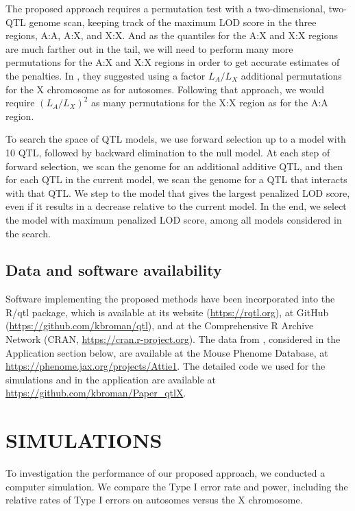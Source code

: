 \documentclass[12pt,letterpaper]{article}
\begin{document}
The proposed approach requires a permutation test with a
two-dimensional, two-QTL genome scan, keeping track of the maximum LOD
score in the three regions, A:A, A:X, and X:X. And as the quantiles
for the A:X and X:X regions are much farther out in the tail, we will
need to perform many more permutations for the A:X and X:X regions in
order to get accurate estimates of the penalties. In
\citet{Broman2006}, they suggested using a factor $L_A/L_X$ additional
permutations for the X chromosome as for autosomes. Following that
approach, we would require $(L_A/L_X)^2$ as many permutations for the
X:X region as for the A:A region.

To search the space of QTL models, we use forward selection up to a
model with 10 QTL, followed by backward elimination to
the null model. At each step of forward selection, we scan the genome
for an additional additive QTL, and then for each QTL in the current
model, we scan the genome for a QTL that interacts with that QTL. We
step to the model that gives the largest penalized LOD score, even if
it results in a decrease relative to the current model. In the end, we
select the model with maximum penalized LOD score, among all models
considered in the search.

\subsection*{Data and software availability}

Software implementing the proposed methods have been incorporated into
the R/qtl package, which is available at its website
(\url{https://rqtl.org}), at GitHub
(\url{https://github.com/kbroman/qtl}), and at the Comprehensive R
Archive Network (CRAN, \url{https://cran.r-project.org}).
The data from \citet{Tian2016}, considered in the Application section
below, are available at
the Mouse Phenome Database, at
\url{https://phenome.jax.org/projects/Attie1}.
The detailed code we used for the simulations and in the application
are available at \url{https://github.com/kbroman/Paper_qtlX}.


\clearpage
\section*{SIMULATIONS}

To investigation the performance of our proposed approach, we
conducted a computer simulation. We compare the Type I error rate and
power, including the relative rates of Type I errors on autosomes
versus the X chromosome.
\end{document}
